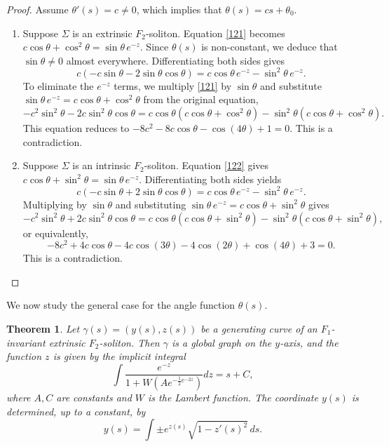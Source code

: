 \documentclass[a4paper,12pt]{amsart}
\theoremstyle{plain}
\newtheorem{theorem}{Theorem}[section]
\theoremstyle{definition}
\begin{document}
\begin{proof}
 Assume $\theta'(s) = c \neq 0$, which implies that $\theta(s) = cs + \theta_0$. 

\begin{enumerate}
\item Suppose $\Sigma$ is an extrinsic $F_2$-soliton. 
Equation \eqref{121} becomes $c\cos\theta + \cos^2\theta = \sin\theta\, e^{-z}$. 
Since $\theta(s)$ is non-constant, we deduce that $\sin\theta \neq 0$ almost everywhere. Differentiating both sides gives
$$c(-c\sin\theta - 2\sin\theta\cos\theta) = c\cos\theta\, e^{-z} - \sin^2\theta\, e^{-z}.$$
To eliminate the $e^{-z}$ terms, we multiply \eqref{121} by $\sin\theta$ and substitute $\sin\theta\, e^{-z} = c\cos\theta + \cos^2\theta$ from the original equation,
$$-c^2\sin^2\theta - 2c\sin^2\theta\cos\theta = c\cos\theta(c\cos\theta + \cos^2\theta) - \sin^2\theta(c\cos\theta + \cos^2\theta).$$
This equation reduces to $-8 c^2-8 c \cos \theta -\cos (4 \theta )+1=0$. This is a contradiction. 

\item Suppose $\Sigma$ is an intrinsic $F_2$-soliton. Equation \eqref{122} gives $c\cos\theta + \sin^2\theta = \sin\theta\, e^{-z}$. 
Differentiating both sides yields
$$c(-c\sin\theta + 2\sin\theta\cos\theta) = c\cos\theta\, e^{-z} - \sin^2\theta\, e^{-z}.$$
Multiplying by $\sin\theta$ and substituting $\sin\theta\, e^{-z} = c\cos\theta + \sin^2\theta$ gives
$$-c^2\sin^2\theta + 2c\sin^2\theta\cos\theta = c\cos\theta(c\cos\theta + \sin^2\theta) - \sin^2\theta(c\cos\theta + \sin^2\theta),$$
or equivalently, 
$$ -8 c^2+4 c \cos \theta-4 c \cos (3 \theta )-4 \cos (2 \theta )+\cos (4 \theta )+3 =0.$$
This is a contradiction. 
\end{enumerate}
\end{proof}

 We now study the general case for the angle function $\theta(s)$.
 
 \begin{theorem}\label{t54}
Let $\gamma(s)=(y(s),z(s))$ be a generating curve of an $F_1$-invariant extrinsic $F_2$-soliton. Then $\gamma$ is a global graph on the $y$-axis, and the function $z$ is given by the implicit integral
\begin{equation}\label{eqf1}
\int \frac{e^{-z}}{1 + W\left( A e^{-\frac{1}{2} e^{-2z}} \right)} dz = s + C,
\end{equation}
where $A, C$ are constants and $W$ is the Lambert function. The coordinate $y(s)$ is determined, up to a constant, by 
$$y(s) = \int \pm e^{z(s)} \sqrt{1 - z'(s)^2}\, ds.$$
\end{theorem}
\end{document}
